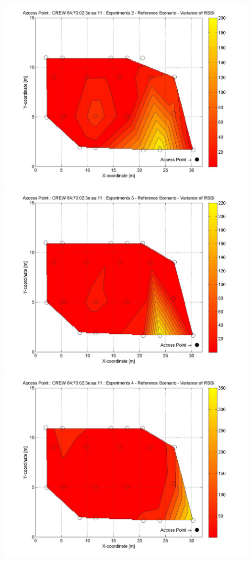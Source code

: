 \documentclass[11pt,a4paper,headinclude,footinclude,chapterprefix=on]{scrreprt}
\begin{document}
\begin{longtable}
	\includegraphics[width=13cm]{../../Source/plot/CREW_11/11_Ref_Ex_2_Variance.jpg} \\
	\includegraphics[width=13cm]{../../Source/plot/CREW_11/11_Ref_Ex_3_Variance.jpg} \\
	\includegraphics[width=13cm]{../../Source/plot/CREW_11/11_Ref_Ex_4_Variance.jpg} 
\end{longtable}
\end{document}

